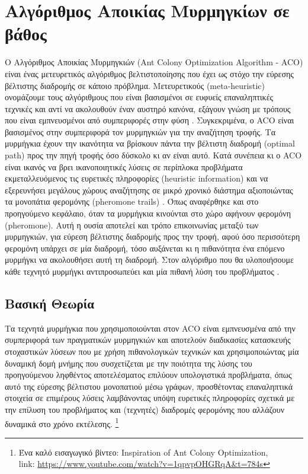 \section{Αλγόριθμος Αποικίας Μυρμηγκίων σε βάθος}
Ο Αλγόριθμος Αποικίας Μυρμηγκιών (Ant Colony Optimization Algorithm - ACO) είναι ένας μετευρετικός αλγόριθμος βελτιστοποίησης που έχει ως στόχο την εύρεσης βέλτιστης διαδρομής σε κάποιο πρόβλημα. Μετευρετικούς (meta-heuristic) ονομάζουμε τους αλγόριθμους που είναι βασισμένοι σε ευφυείς επαναληπτικές τεχνικές και αντί να ακολουθούν έναν αυστηρό κανόνα, εξάγουν γνώση με τρόπους που είναι εμπνευσμένοι από συμπεριφορές στην φύση \cite{ribeiro2002ant}. Συγκεκριμένα, ο ACO είναι βασισμένος στην συμπεριφορά τον μυρμηγκιών για την αναζήτηση τροφής. 
Τα μυρμήγκια έχουν την ικανότητα να βρίσκουν πάντα την βέλτιστη διαδρομή (optimal path) προς την πηγή τροφής όσο δύσκολο κι αν είναι αυτό. Κατά συνέπεια κι ο ACO είναι ικανός να βρει ικανοποιητικές λύσεις σε περίπλοκα προβλήματα εκμεταλλευόμενος τις ευρετικές πληροφορίες (heuristic information) και να εξερευνήσει μεγάλους χώρους αναζήτησης σε μικρό χρονικό διάστημα αξιοποιώντας τα μονοπάτια φερομόνης (pheromone trails) \cite{mavrovouniotis2017survey}. Όπως αναφέρθηκε και στο προηγούμενο κεφάλαιο, όταν τα μυρμήγκια κινούνται στο χώρο αφήνουν φερομόνη (pheromone). Αυτή η ουσία αποτελεί και τρόπο επικοινωνίας μεταξύ των μυρμηγκιών, για εύρεση βέλτιστης διαδρομής προς την τροφή, αφού όσο περισσότερη φερομόνη υπάρχει σε μία διαδρομή, τόσο αυξάνεται κι η πιθανότητα ένα επόμενο μυρμήγκι να ακολουθήσει αυτή τη διαδρομή. Στον αλγόριθμο που θα υλοποιήσουμε κάθε τεχνητό μυρμήγκι αντιπροσωπεύει και μία πιθανή λύση του προβλήματος \cite{mavrovouniotis2017survey}. 


\subsection{Βασική Θεωρία}
Τα τεχνητά μυρμήγκια που χρησιμοποιούνται στον ACO είναι εμπνευσμένα από την συμπεριφορά των πραγματικών μυρμηγκιών και αποτελούν διαδικασίες κατασκευής στοχαστικών λύσεων που με χρήση πιθανολογικών τεχνικών και χρησιμοποιώντας μία δυναμική δομή μνήμης που συσχετίζεται με την ποιότητα της λύσης του προηγούμενου ληφθέντος αποτελέσματος επιλύουν υπολογιστικά προβλήματα, όπως αυτό της εύρεσης βέλτιστου μονοπατιού μέσω γράφων, προσθέτοντας επαναληπτικά στοιχεία σε επιμέρους λύσεις λαμβάνοντας υπόψη ευρετικές πληροφορίες σχετικά με την επίλυση του προβλήματος και (τεχνητές) διαδρομές φερομόνης που αλλάζουν δυναμικά στο χρόνο εκτέλεσης. \cite{dorigo2003ant} \cite{mavrovouniotis2017survey} \footnote{Ένα καλό εισαγωγικό βίντεο: Inspiration of Ant Colony Optimization,\\ link: \url{https://www.youtube.com/watch?v=1qpvpOHGRqA&t=784s}}

